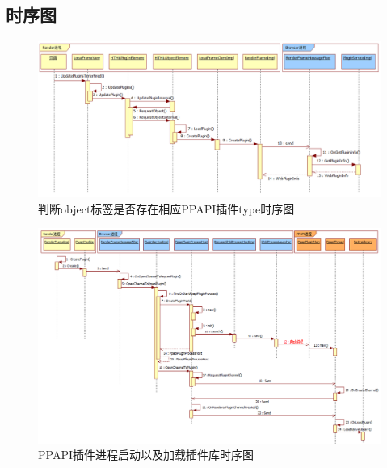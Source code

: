 \subsection{时序图}
\begin{figure}[H] 
  \centering 
  \includegraphics[width=\textwidth]{image/ppapi/ppapi_is_type.jpg} 
  \caption{判断object标签是否存在相应PPAPI插件type时序图}
\end{figure}

\begin{figure}[H] 
  \centering 
  \includegraphics[width=\textwidth]{image/ppapi/ppapi_process.jpg} 
  \caption{PPAPI插件进程启动以及加载插件库时序图}
\end{figure}


\ifx\withtbrowser\undefined
\else

\fi
